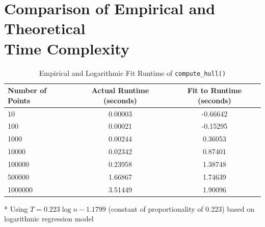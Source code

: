 \documentclass[12pt]{article}
\begin{document}
\section[Comparison of Empirical and Theoretical Time Complexity]{Comparison of Empirical and Theoretical \\ Time Complexity}
\begin{table}[h]
    \centering
    \begin{threeparttable}
        \begin{tabular*}{\textwidth}{@{\extracolsep{\fill}}lcc@{}}
            \toprule
            \textbf{Number of Points} & \textbf{Actual Runtime (seconds)} & \textbf{Fit to Runtime\tnote{*} (seconds)}\\ \midrule
            10 & 0.00003 & -0.66642 \\
            100 & 0.00021 & -0.15295 \\
            1000 & 0.00244 & 0.36053 \\
            10000 & 0.02342 & 0.87401 \\
            100000 & 0.23958 & 1.38748 \\
            500000 & 1.66867 & 1.74639 \\
            1000000 & 3.51449 & 1.90096 \\ \bottomrule
        \end{tabular*}
        \begin{tablenotes}
            \item[*] Using $T = 0.223\log n - 1.1799$ (constant of proportionality of 0.223) based on logarithmic regression model
        \end{tablenotes}
        \caption{Empirical and Logarithmic Fit Runtime of \texttt{compute\_hull()}}
        \label{tab:runtime}
    \end{threeparttable}
\end{table}

\pgfplotsset{compat=1.18}
\end{document}

